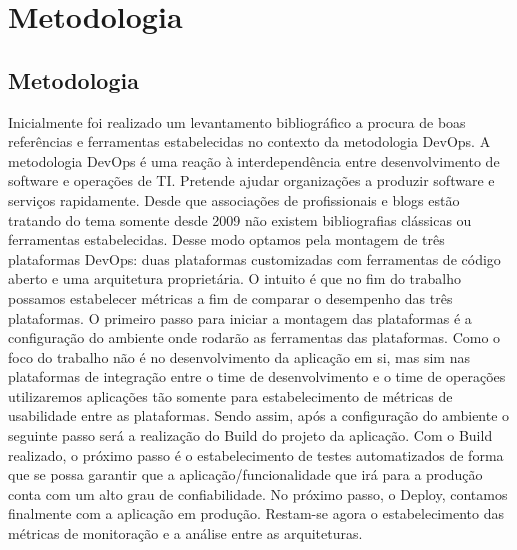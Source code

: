 \chapter{Metodologia}

\section{Metodologia}

Inicialmente foi realizado um levantamento bibliográfico a procura de boas referências e ferramentas estabelecidas no contexto da metodologia DevOps. A metodologia DevOps é uma reação à interdependência entre desenvolvimento de software e operações de TI. Pretende ajudar organizações a produzir software e serviços rapidamente. Desde que associações de profissionais e blogs estão tratando do tema somente desde 2009 não existem bibliografias clássicas ou ferramentas estabelecidas. Desse modo optamos pela montagem de três plataformas DevOps: duas plataformas customizadas com ferramentas de código aberto e uma arquitetura proprietária. O intuito é que no fim do trabalho possamos estabelecer métricas a fim de comparar o desempenho das três plataformas.
O primeiro passo para iniciar a montagem das plataformas é a configuração do ambiente onde rodarão as ferramentas das plataformas.
Como o foco do trabalho não é no desenvolvimento da aplicação em si, mas sim nas plataformas de integração entre o time de desenvolvimento e o time de operações utilizaremos aplicações tão somente para estabelecimento de métricas de usabilidade entre as plataformas. Sendo assim, após a configuração do ambiente o seguinte passo será a realização do Build do projeto da aplicação.
Com o Build realizado, o próximo passo é o estabelecimento de testes automatizados de forma que se possa garantir que a aplicação/funcionalidade que irá para a produção conta com um alto grau de confiabilidade.
No próximo passo, o Deploy, contamos finalmente com a aplicação em produção. Restam-se agora o estabelecimento das métricas de monitoração e a análise entre as arquiteturas.
